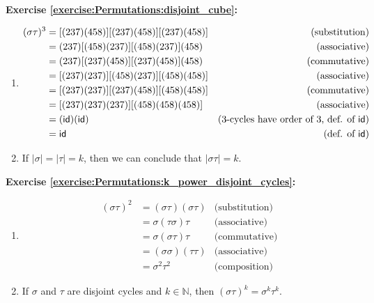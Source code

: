 \noindent\textbf{Exercise \ref{exercise:Permutations:disjoint_cube}:}
\begin{enumerate}[{a.}]
\item
\begin{align*}
(\sigma\tau)^3 &= [(237)(458)][(237)(458)][(237)(458)] &\text{(substitution)}
\\
&= (237)[(458)(237)][(458)(237)](458) &\text{(associative)}
\\
&= (237)[(237)(458)][(237)(458)](458) &\text{(commutative)}
\\
&= [(237)(237)][(458)(237)][(458)(458)] &\text{(associative)}
\\
&= [(237)(237)][(237)(458)][(458)(458)] &\text{(commutative)}
\\
&= [(237)(237)(237)][(458)(458)(458)] &\text{(associative)}
\\
&= (\sf{id})(\sf{id}) &\text{(3-cycles have order of 3, def. of\ } \sf{id})
\\
&= \sf{id} &\text{(def. of\ } \sf{id})
\end{align*}

\item
If $|\sigma| = |\tau| = k$, then we can conclude that $|\sigma\tau| = k$.
\end{enumerate}

\noindent\textbf{Exercise \ref{exercise:Permutations:k_power_disjoint_cycles}:}
\begin{enumerate}[{a.}]
\item
\begin{align*}
(\sigma\tau)^2 &= (\sigma\tau)(\sigma\tau) &\text{(substitution)}
\\
&= \sigma(\tau\sigma)\tau &\text{(associative)}
\\
&= \sigma(\sigma\tau)\tau &\text{(commutative)}
\\
& =(\sigma\sigma)(\tau\tau) &\text{(associative)}
\\
& =\sigma^2\tau^2 &\text{(composition)}
\end{align*}

\item
If $\sigma$ and $\tau$ are disjoint cycles and $k \in {\mathbb N}$, then $(\sigma\tau)^k = \sigma^k\tau^k$.
\end{enumerate}

